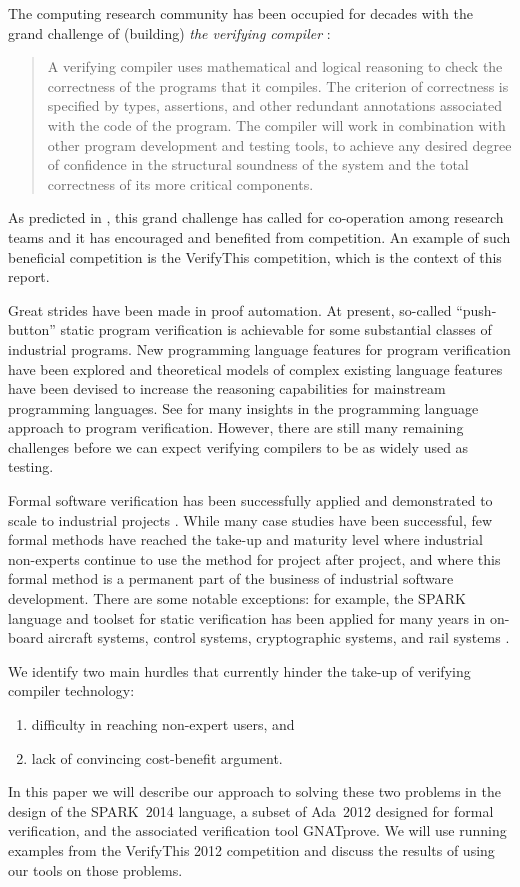 \documentclass[sttt,final]{svjour}
\newcommand{\gnatprove}{GNATprove\xspace}
\newcommand{\newspark}{SPARK~2014\xspace}
\newcommand{\adatwtw}{Ada~2012\xspace}
\begin{document}
The computing research community has been occupied for decades with
the grand challenge of (building) \emph{the verifying compiler}
\cite{Hoare03theverifying}:
%
\begin{quote} A verifying compiler uses mathematical and logical reasoning
  to check the correctness of the programs that it compiles. The
  criterion of correctness is specified by types, assertions, and
  other redundant annotations associated with the code of the
  program. The compiler will work in combination with other program
  development and testing tools, to achieve any desired degree of
  confidence in the structural soundness of the system and the total
  correctness of its more critical components.
\end{quote}

As predicted in \cite{Hoare03theverifying}, this grand challenge has
called for co-operation among research teams and it has encouraged
and benefited from competition. An example of such beneficial
competition is the VerifyThis competition, which is the context of
this report.

Great strides have been made in proof automation. At present,
so-called ``push-button'' static program verification is achievable for some
substantial classes of industrial programs. New programming language
features for program verification have been explored and theoretical
models of complex existing language features have been devised to
increase the reasoning capabilities for mainstream programming
languages. See \cite{HatcliffLLMP12} for many insights in the
programming language approach to program verification. However, there
are still many remaining challenges before we can expect verifying
compilers to be as widely used as testing.

Formal software verification has been successfully applied and demonstrated
to scale to industrial projects \cite{Woodcock2009,vcc2009}. While many
case studies have been successful, few formal methods have reached the
take-up and maturity level where industrial non-experts continue to use the
method for project after project, and where this formal method is a
permanent part of the business of industrial software development. There
are some notable exceptions: for example, the SPARK language and toolset
for static verification has been applied for many years in on-board
aircraft systems, control systems, cryptographic systems, and rail systems
\cite{sparkbook2012,oneill2012}.

We identify two main hurdles that currently hinder the
take-up of verifying compiler technology:
%
\begin{enumerate}
\item difficulty in reaching non-expert users, and
\item lack of convincing cost-benefit argument.
\end{enumerate}
%
In this paper we will describe our approach to solving these two problems
in the design of the \newspark language, a subset of \adatwtw designed for
formal verification, and the associated verification tool \gnatprove. We
will use running examples from the VerifyThis 2012 competition and discuss
the results of using our tools on those problems.
\end{document}
